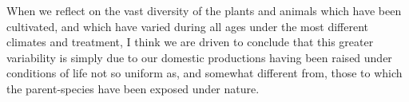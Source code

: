 When we reflect on the vast diversity of the plants and animals which have been cultivated, and which have varied during all ages under the most different climates and treatment, I think we are driven to conclude that this greater variability is simply due to our domestic productions having been raised under conditions of life not so uniform as, and somewhat different from, those to which the parent-species have been exposed under nature.